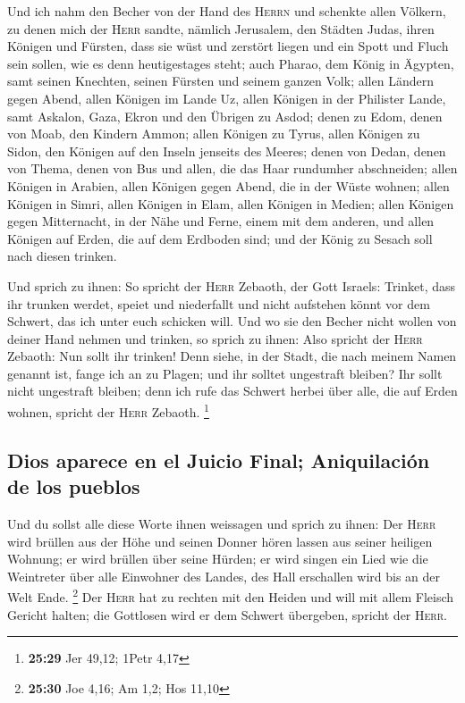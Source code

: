  Und ich nahm den Becher von der Hand des \textsc{Herrn}
und schenkte allen Völkern, zu denen mich der \textsc{Herr} sandte,
 nämlich Jerusalem, den Städten Judas, ihren Königen und
Fürsten, dass sie wüst und zerstört liegen und ein Spott und Fluch sein
sollen, wie es denn heutigestages steht;  auch Pharao,
dem König in Ägypten, samt seinen Knechten, seinen Fürsten und seinem
ganzen Volk;  allen Ländern gegen Abend, allen Königen im
Lande Uz, allen Königen in der Philister Lande, samt Askalon, Gaza,
Ekron und den Übrigen zu Asdod;  denen zu Edom, denen von
Moab, den Kindern Ammon;  allen Königen zu Tyrus, allen
Königen zu Sidon, den Königen auf den Inseln jenseits des Meeres;
 denen von Dedan, denen von Thema, denen von Bus und
allen, die das Haar rundumher abschneiden;  allen Königen
in Arabien, allen Königen gegen Abend, die in der Wüste wohnen;
 allen Königen in Simri, allen Königen in Elam, allen
Königen in Medien;  allen Königen gegen Mitternacht, in
der Nähe und Ferne, einem mit dem anderen, und allen Königen auf Erden,
die auf dem Erdboden sind; und der König zu Sesach soll nach diesen
trinken.

 Und sprich zu ihnen: So spricht der \textsc{Herr}
Zebaoth, der Gott Israels: Trinket, dass ihr trunken werdet, speiet und
niederfallt und nicht aufstehen könnt vor dem Schwert, das ich unter
euch schicken will.  Und wo sie den Becher nicht wollen
von deiner Hand nehmen und trinken, so sprich zu ihnen: Also spricht der
\textsc{Herr} Zebaoth: Nun sollt ihr trinken!  Denn
siehe, in der Stadt, die nach meinem Namen genannt ist, fange ich an zu
Plagen; und ihr solltet ungestraft bleiben? Ihr sollt nicht ungestraft
bleiben; denn ich rufe das Schwert herbei über alle, die auf Erden
wohnen, spricht der \textsc{Herr} Zebaoth. \footnote{\textbf{25:29} Jer
  49,12; 1Petr 4,17}

\hypertarget{dios-aparece-en-el-juicio-final-aniquilaciuxf3n-de-los-pueblos}{%
\subsection{Dios aparece en el Juicio Final; Aniquilación de los
pueblos}\label{dios-aparece-en-el-juicio-final-aniquilaciuxf3n-de-los-pueblos}}

 Und du sollst alle diese Worte ihnen weissagen und
sprich zu ihnen: Der \textsc{Herr} wird brüllen aus der Höhe und seinen
Donner hören lassen aus seiner heiligen Wohnung; er wird brüllen über
seine Hürden; er wird singen ein Lied wie die Weintreter über alle
Einwohner des Landes, des Hall erschallen wird bis an der Welt Ende.
\footnote{\textbf{25:30} Joe 4,16; Am 1,2; Hos 11,10} 
Der \textsc{Herr} hat zu rechten mit den Heiden und will mit allem
Fleisch Gericht halten; die Gottlosen wird er dem Schwert übergeben,
spricht der \textsc{Herr}.

